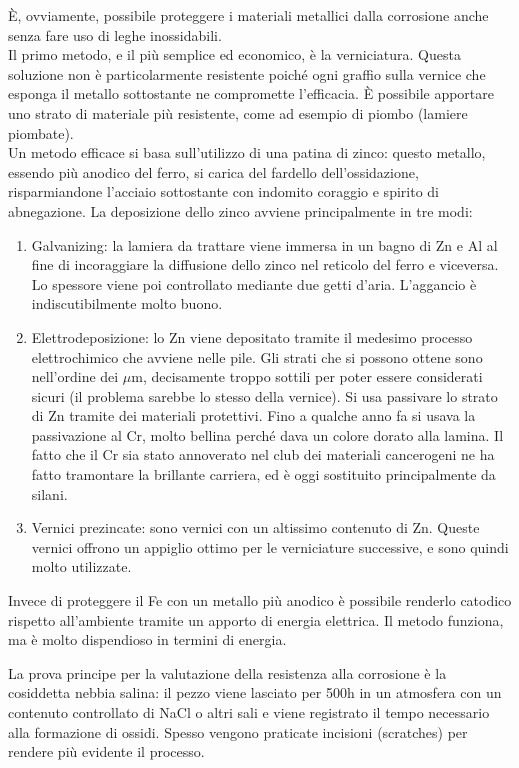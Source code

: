 È, ovviamente, possibile proteggere i materiali metallici dalla corrosione anche senza fare uso di leghe inossidabili.\\
Il primo metodo, e il più semplice ed economico, è la verniciatura. Questa soluzione non è particolarmente resistente poiché ogni graffio sulla vernice che esponga il metallo sottostante ne compromette l'efficacia. È possibile apportare uno strato di materiale più resistente, come ad esempio di piombo (lamiere piombate).\\
Un metodo efficace si basa sull'utilizzo di una patina di zinco: questo metallo, essendo più anodico del ferro, si carica del fardello dell'ossidazione, risparmiandone l'acciaio sottostante con indomito coraggio e spirito di abnegazione. La deposizione dello zinco avviene principalmente in tre modi:
\begin{enumerate}
    \item Galvanizing: la lamiera da trattare viene immersa in un bagno di Zn e Al al fine di incoraggiare la diffusione dello zinco nel reticolo del ferro e viceversa. Lo spessore viene poi controllato mediante due getti d'aria. L'aggancio è indiscutibilmente molto buono.
    \item Elettrodeposizione: lo Zn viene depositato tramite il medesimo processo elettrochimico che avviene nelle pile. Gli strati che si possono ottene sono nell'ordine dei $\mu$m, decisamente troppo sottili per poter essere considerati sicuri (il problema sarebbe lo stesso della vernice). Si usa passivare lo strato di Zn tramite dei materiali protettivi. Fino a qualche anno fa si usava la passivazione al Cr, molto bellina perché dava un colore dorato alla  lamina. Il fatto che il Cr sia stato annoverato nel club dei materiali cancerogeni ne ha fatto tramontare la brillante carriera, ed è oggi sostituito principalmente da silani.
    \item Vernici prezincate: sono vernici con un altissimo contenuto di Zn. Queste vernici offrono un appiglio ottimo per le verniciature successive, e sono quindi molto utilizzate.
\end{enumerate}
Invece di proteggere il Fe con un metallo più anodico è possibile renderlo catodico rispetto all'ambiente tramite un apporto di energia elettrica. Il metodo funziona, ma è molto dispendioso in termini di energia.

La prova principe per la valutazione della resistenza alla corrosione è la cosiddetta nebbia salina: il pezzo viene lasciato per 500h in un atmosfera con un contenuto controllato di NaCl o altri sali e viene registrato il tempo necessario alla formazione di ossidi. Spesso vengono praticate incisioni (scratches) per rendere più evidente il processo.

